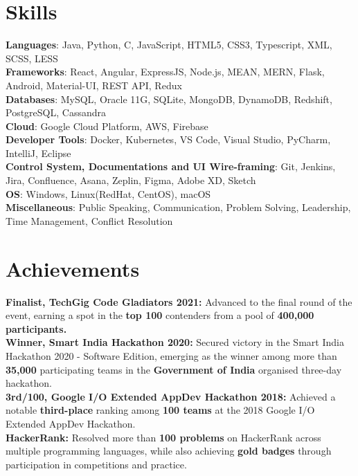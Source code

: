 \documentclass[letterpaper,11pt]{article}
\begin{document}
%
\section{Skills}
 \begin{itemize}[leftmargin=0.15in, label={}]
    \small{\item{
     \textbf{Languages}{: Java, Python, C, JavaScript, HTML5, CSS3, Typescript, XML, SCSS, LESS} \\
     \textbf{Frameworks}{: React, Angular, ExpressJS, Node.js, MEAN, MERN, Flask, Android, Material-UI, REST API, Redux} \\
     \textbf{Databases}{: MySQL, Oracle 11G, SQLite, MongoDB, DynamoDB, Redshift, PostgreSQL, Cassandra} \\
     \textbf{Cloud}{: Google Cloud Platform, AWS, Firebase} \\
     \textbf{Developer Tools}{: Docker, Kubernetes, VS Code, Visual Studio, PyCharm, IntelliJ, Eclipse} \\
     \textbf{Control System, Documentations and UI Wire-framing}{: Git, Jenkins, Jira, Confluence, Asana, Zeplin, Figma, Adobe XD, Sketch} \\
     \textbf{OS}{: Windows, Linux(RedHat, CentOS), macOS} \\
     \textbf{Miscellaneous}{: Public Speaking, Communication, Problem Solving, Leadership, Time Management, Conflict Resolution }
    }}
 \end{itemize}

\section{Achievements}
 \begin{itemize}[leftmargin=0.15in, label={}]
    \small{\item{
     \textbf{Finalist, TechGig Code Gladiators 2021:}{ Advanced to the final round of the event, earning a spot in the \textbf{top 100} contenders from a pool of \textbf{400,000 participants.}} \\
     \textbf{Winner, Smart India Hackathon 2020:}{ Secured victory in the Smart India Hackathon 2020 - Software Edition, emerging as the winner among more than \textbf{35,000} participating teams in the \textbf{Government of India} organised three-day hackathon.} \\
     \textbf{3rd/100, Google I/O Extended AppDev Hackathon 2018:}{ Achieved a notable \textbf{third-place} ranking among \textbf{100 teams} at the 2018 Google I/O Extended AppDev Hackathon.} \\
     \textbf{HackerRank:}{ Resolved more than \textbf{100 problems} on HackerRank across multiple programming languages, while also achieving \textbf{gold badges} through participation in competitions and practice.} \\
    }}
 \end{itemize}
\end{document}
